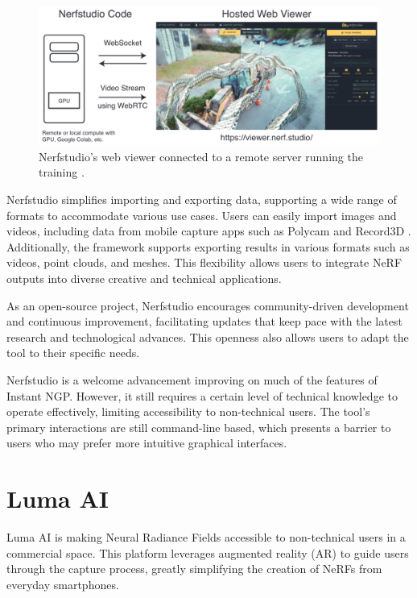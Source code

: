 \begin{figure}[h!]
  \centering
  \includegraphics[width=\textwidth]{figures/related-nerfstudio-viewer.png}
  \caption{Nerfstudio's web viewer connected to a remote server running the training \cite{tancik_nerfstudio_2023}.}
  \label{fig:nerfstudio-viewer}
\end{figure}

Nerfstudio simplifies importing and exporting data, supporting a wide range of formats to accommodate various use cases.
Users can easily import images and videos, including data from mobile capture apps such as Polycam \cite{noauthor_polycam_nodate} and Record3D \cite{noauthor_record3d_nodate}.
Additionally, the framework supports exporting results in various formats such as videos, point clouds, and meshes.
This flexibility allows users to integrate NeRF outputs into diverse creative and technical applications.

As an open-source project, Nerfstudio encourages community-driven development and continuous improvement, facilitating updates that keep pace with the latest research and technological advances.
This openness also allows users to adapt the tool to their specific needs.

Nerfstudio is a welcome advancement improving on much of the features of Instant NGP.
However, it still requires a certain level of technical knowledge to operate effectively, limiting accessibility to non-technical users.
The tool's primary interactions are still command-line based, which presents a barrier to users who may prefer more intuitive graphical interfaces.

\section{Luma AI}
\label{sec:related:luma}

Luma AI \cite{noauthor_luma_nodate} is making Neural Radiance Fields accessible to non-technical users in a commercial space.
This platform leverages augmented reality (AR) to guide users through the capture process, greatly simplifying the creation of NeRFs from everyday smartphones.

